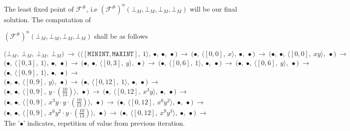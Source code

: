 \documentclass[final,3p, review, times]{Elsevier/elsarticle}
\begin{document}
The least fixed point of $\mathcal{F^\#}$, i.e $(\mathcal{F^\#})^n(\bot_M, \bot_M, \bot_M, \bot_M)$ will be our final solution. The computation of

\noindent$(\mathcal{F^\#})^n(\bot_M, \bot_M, \bot_M, \bot_M)$ shall be as follows

\noindent
$
\bigg(\bot_M,\ \bot_M,\ \bot_M,\ \bot_M\bigg)\ \to\ 
\bigg(\big\langle[\mathtt{MININT},\mathtt{MAXINT}],\ 1\big\rangle,\ \bullet,\ \bullet,\ \bullet\bigg)\ \to\ 
\bigg(\bullet,\ \big\langle[0,0],\ x\big\rangle,\ \bullet,\ \bullet\bigg)\ \to\ 
\bigg(\bullet,\ \bullet,\ \big\langle[0,0],\ xy\big\rangle,\ \bullet\bigg)\ \to
$\\
$
\bigg(\bullet,\ \big\langle[0,3],\ 1\big\rangle,\ \bullet,\ \bullet\bigg)\ \to\ 
\bigg(\bullet,\ \bullet,\ \big\langle[0,3],\ y\big\rangle,\ \bullet\bigg)\ \to\ 
\bigg(\bullet,\ \big\langle[0,6],\ 1\big\rangle,\ \bullet,\ \bullet\bigg)\ \to\ 
\bigg(\bullet,\ \bullet,\ \big\langle[0,6],\ y\big\rangle,\ \bullet\bigg)\ \to
$\\
$
\bigg(\bullet,\ \big\langle[0,9],\ 1\big\rangle,\ \bullet,\ \bullet\bigg)\ \to
$\\
$\bigg(\bullet,\ \bullet,\ \big\langle[0,9],\ y\big\rangle,\ \bullet\bigg)\ \to\ 
\bigg(\bullet,\ \big\langle[0,12],\ 1\big\rangle,\ \bullet,\ \bullet\bigg)\ \to
$\\
$
\bigg(\bullet,\ \bullet,\ \big\langle[0,9],\ y\cdot\left(\frac{10}{13}\right)\big\rangle,\ \bullet\bigg)\ \to\ 
\bigg(\bullet,\ \big\langle[0,12],\ x^3y\big\rangle,\ \bullet,\ \bullet\bigg)\ \to
$\\
$
\bigg(\bullet,\ \bullet,\ \big\langle[0,9],\ x^3y\cdot y\cdot\left(\frac{10}{13}\right)\big\rangle,\ \bullet\bigg)\ \to\ 
\bigg(\bullet,\ \big\langle[0,12],\ x^6y^2\big\rangle,\ \bullet,\ \bullet\bigg)\ \to
$\\
$
\bigg(\bullet,\ \bullet,\ \big\langle[0,9],\ x^6y^2\cdot y\cdot\left(\frac{10}{13}\right)\big\rangle,\ \bullet\bigg)\ \to\ 
\bigg(\bullet,\ \big\langle[0,12],\ x^9y^3\big\rangle,\ \bullet,\ \bullet\bigg)\ \to
$\\
    
The '$\bullet$' indicates, repetition of value from previous iteration.

 









\end{document}
